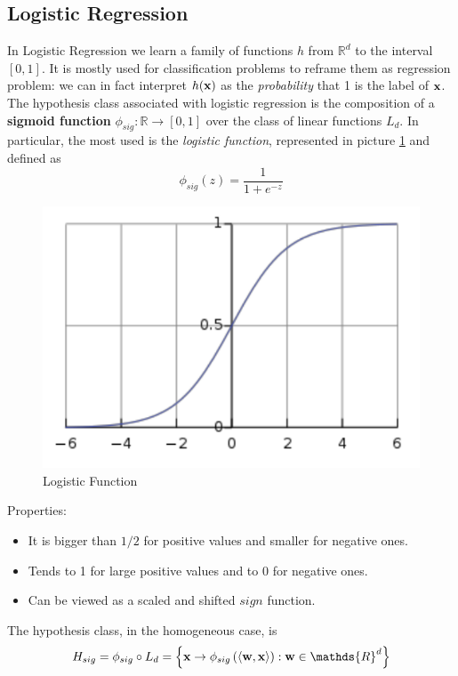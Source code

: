 \documentclass[12pt]{report}
\theoremstyle{plain}
\newcommand\sprod[2]{\langle \vb{#1},\vb{#2}\rangle}
\begin{document}
\begin{flushleft}
\section{Logistic Regression}
In Logistic Regression we learn a family of functions $h$ from $\mathds{R}^d$ 
to the interval $[0,1]$. It is mostly used for classification problems to 
reframe them as regression problem: we can in fact interpret $h(\vb{x})$ as the 
\textit{probability} that 1 is the label of $\vb{x}$.\\
The hypothesis class associated with logistic regression is the composition of 
a \textbf{sigmoid function} $\phi_{sig}:\mathds{R}\to[0,1]$ over the class of 
linear functions $L_d$. In particular, the most used is the \textit{logistic 
function}, represented in picture \ref{fig:logistic_func} and defined as
\[ \phi_{sig}(z)=\frac{1}{1+e^{-z}} \]
\begin{figure}[!h]
	\centering
	\includegraphics[scale=0.7]{images/logistic_func.pdf}
	\caption{Logistic Function}
	\label{fig:logistic_func}
\end{figure}
Properties:
\begin{itemize}
	\item It is bigger than $1/2$ for positive values and smaller for negative 
	ones.
	\item Tends to 1 for large positive values and to 0 for negative ones.
	\item Can be viewed as a scaled and shifted $sign$ function.
\end{itemize}
The hypothesis class, in the homogeneous case, is
\[ H_{sig}=\phi_{sig}\circ 
L_d=\left\{\vb{x}\to\phi_{sig}\left(\sprod{w}{x}\right):\vb{w}\in\mathds{R}^d 
\right\} \]

\end{flushleft}
\end{document}
